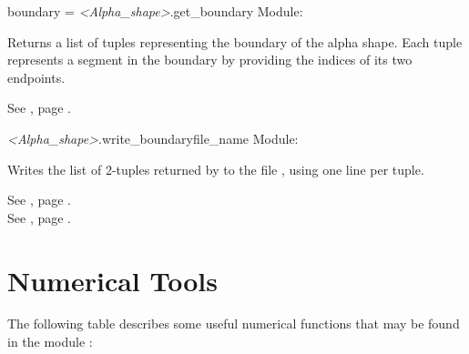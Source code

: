\documentclass{manual}
\begin{document}
\label{ref:method_get_boundary}
\begin{methoddesc}{boundary = \emph{<Alpha_shape>}.get_boundary}{}
Module: 

Returns a list of tuples representing the boundary of the alpha
shape. Each tuple represents a segment in the boundary by providing
the indices of its two endpoints.

See , page \pageref{ref:method_set_boundary_type}.
\end{methoddesc}

\label{ref:method_write_boundary}
\begin{methoddesc}{\emph{<Alpha_shape>}.write_boundary}{file_name}
Module: 

Writes the list of 2-tuples returned by  to the
file , using one line per tuple.

See , page \pageref{ref:method_set_boundary_type}. \\
See , page \pageref{ref:method_get_boundary}.
\end{methoddesc}


\pagebreak
\section{Numerical Tools}

The following table describes some useful numerical functions that
may be found in the module :
\end{document}
